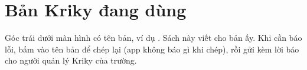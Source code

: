 
\section{Bản Kriky đang dùng}

Góc trái dưới màn hình có tên bản, ví dụ \nhan{\tenban}. Sách này viết cho bản ấy. Khi cần báo lỗi,
bấm vào tên bản để chép lại (app không báo gì khi chép), rồi gửi kèm lời báo cho người quản lý Kriky
của trường.
